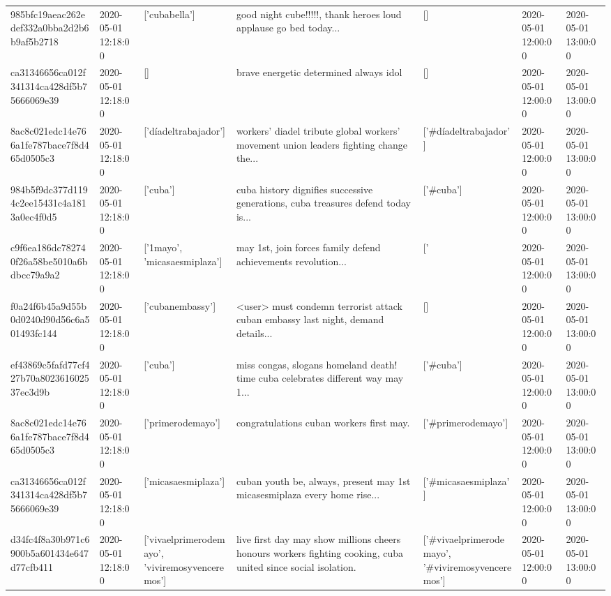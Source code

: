 \begin{tabular}{lllllll}
985bfc19aeac262edef332a0bba2d2b6b9af5b2718 & 2020-05-01 12:18:00 & ['cubabella'] & good night cube!!!!!, thank heroes loud applause go bed today... & [] & 2020-05-01 12:00:00 & 2020-05-01 13:00:00 \\
ca31346656ca012f341314ca428df5b75666069e39 & 2020-05-01 12:18:00 & [] & brave energetic determined always idol & [] & 2020-05-01 12:00:00 & 2020-05-01 13:00:00 \\
8ac8c021edc14e766a1fe787bace7f8d465d0505c3 & 2020-05-01 12:18:00 & ['díadeltrabajador'] & workers' diadel tribute global workers' movement union leaders fighting change the... & ['#díadeltrabajador'] & 2020-05-01 12:00:00 & 2020-05-01 13:00:00 \\
984b5f9dc377d1194c2ee15431c4a1813a0ec4f0d5 & 2020-05-01 12:18:00 & ['cuba'] & cuba history dignifies successive generations, cuba treasures defend today is... & ['#cuba'] & 2020-05-01 12:00:00 & 2020-05-01 13:00:00 \\
c9f6ea186dc782740f26a58be5010a6bdbcc79a9a2 & 2020-05-01 12:18:00 & ['1mayo', 'micasaesmiplaza'] & may 1st, join forces family defend achievements revolution... & ['#1mayo', '#micasaesmiplaza'] & 2020-05-01 12:00:00 & 2020-05-01 13:00:00 \\
f0a24f6b45a9d55b0d0240d90d56c6a501493fc144 & 2020-05-01 12:18:00 & ['cubanembassy'] & <user> must condemn terrorist attack cuban embassy last night, demand details... & [] & 2020-05-01 12:00:00 & 2020-05-01 13:00:00 \\
ef43869c5fafd77cf427b70a802361602537ec3d9b & 2020-05-01 12:18:00 & ['cuba'] & miss congas, slogans homeland death! time cuba celebrates different way may 1... & ['#cuba'] & 2020-05-01 12:00:00 & 2020-05-01 13:00:00 \\
8ac8c021edc14e766a1fe787bace7f8d465d0505c3 & 2020-05-01 12:18:00 & ['primerodemayo'] & congratulations cuban workers first may. & ['#primerodemayo'] & 2020-05-01 12:00:00 & 2020-05-01 13:00:00 \\
ca31346656ca012f341314ca428df5b75666069e39 & 2020-05-01 12:18:00 & ['micasaesmiplaza'] & cuban youth be, always, present may 1st micasesmiplaza every home rise... & ['#micasaesmiplaza'] & 2020-05-01 12:00:00 & 2020-05-01 13:00:00 \\
d34fc4f8a30b971c6900b5a601434e647d77cfb411 & 2020-05-01 12:18:00 & ['vivaelprimerodemayo', 'viviremosyvenceremos'] & live first day may show millions cheers honours workers fighting cooking, cuba united since social isolation. & ['#vivaelprimerodemayo', '#viviremosyvenceremos'] & 2020-05-01 12:00:00 & 2020-05-01 13:00:00 \\

\end{tabular}
